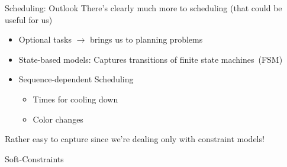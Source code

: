 \documentclass[handout,10pt,xcolor={dvipsnames},fleqn]{beamer}
\begin{document}
\begin{frame}{Scheduling: Outlook}
There's clearly much more to scheduling (that could be useful for us)
\begin{itemize}
\item Optional tasks $\rightarrow$ brings us to \alert{planning} problems
\item State-based models: Captures transitions of finite state machines~(FSM)
\item Sequence-dependent Scheduling
\begin{itemize}
\item Times for cooling down
\item Color changes 
\end{itemize} 
\end{itemize}

\begin{parchment}
Rather easy to capture since we're dealing only with \alert{constraint models}!
\end{parchment}
\end{frame}


\begin{frame}{Soft-Constraints}

\end{frame}
\end{document}

